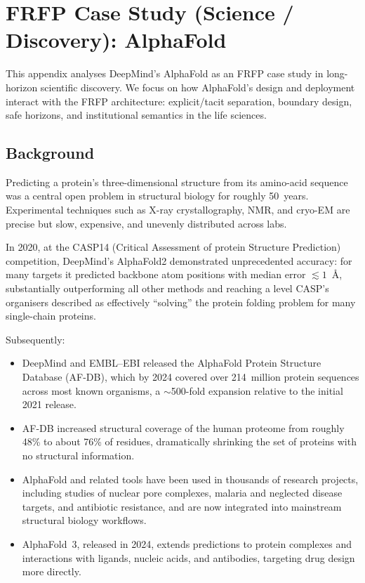 
\section{FRFP Case Study (Science / Discovery): AlphaFold}
\label{app:frfp-alphafold}

This appendix analyses DeepMind’s AlphaFold as an FRFP case study in
long-horizon scientific discovery.
We focus on how AlphaFold’s design and deployment interact with the FRFP
architecture: explicit/tacit separation, boundary design, safe horizons, and
institutional semantics in the life sciences.

\subsection{Background}

Predicting a protein’s three-dimensional structure from its amino-acid
sequence was a central open problem in structural biology for roughly
50~years.
Experimental techniques such as X-ray crystallography, NMR, and cryo-EM are
precise but slow, expensive, and unevenly distributed across labs.

In 2020, at the CASP14 (Critical Assessment of protein Structure Prediction)
competition, DeepMind’s AlphaFold2 demonstrated unprecedented accuracy:
for many targets it predicted backbone atom positions with median error
$\lesssim 1$~\AA, substantially outperforming all other methods and reaching
a level CASP’s organisers described as effectively ``solving'' the protein
folding problem for many single-chain proteins.

Subsequently:

\begin{itemize}
  \item DeepMind and EMBL–EBI released the AlphaFold Protein Structure
        Database (AF-DB), which by 2024 covered over 214~million protein
        sequences across most known organisms, a $\sim$500-fold expansion
        relative to the initial 2021 release.
  \item AF-DB increased structural coverage of the human proteome from
        roughly 48\% to about 76\% of residues, dramatically shrinking the
        set of proteins with no structural information.
  \item AlphaFold and related tools have been used in thousands of research
        projects, including studies of nuclear pore complexes, malaria and
        neglected disease targets, and antibiotic resistance, and are now
        integrated into mainstream structural biology workflows.
  \item AlphaFold~3, released in 2024, extends predictions to protein
        complexes and interactions with ligands, nucleic acids, and
        antibodies, targeting drug design more directly.
\end{itemize}

